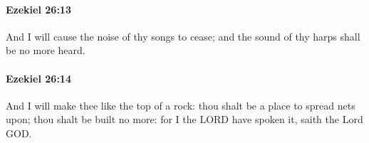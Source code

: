 		\paragraph{Ezekiel 26:13} %
			\label{EZEKIEL-26-13}

			And I will cause the noise of thy songs to cease; and the sound of thy harps shall be no more heard.


		\paragraph{Ezekiel 26:14} %
			\label{EZEKIEL-26-14}

			And I will make thee like the top of a rock: thou shalt be a place to spread nets upon; thou shalt be built no more: for I the LORD have spoken it, saith the Lord GOD.


